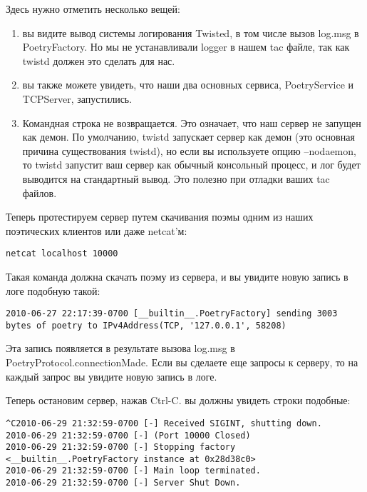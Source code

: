 Здесь нужно отметить несколько вещей:

\begin{enumerate}

\item вы видите вывод системы логирования Twisted, в том числе вызов 
log.msg в PoetryFactory. Но мы не устанавливали logger в нашем tac 
файле, так как twistd должен это сделать для нас.  

\item вы также можете увидеть, что наши два основных сервиса, PoetryService и TCPServer,
запустились.

\item Командная строка не возвращается. Это означает, что наш сервер 
не запущен как демон. По умолчанию, twistd запускает сервер как демон (это 
основная причина существования twistd), но если вы используете опцию 
--nodaemon, то twistd запустит ваш сервер как обычный консольный процесс, и 
лог будет выводится на стандартный вывод. Это полезно при отладки ваших 
tac файлов.

\end{enumerate}


Теперь протестируем сервер путем скачивания поэмы одним из 
наших поэтических клиентов или даже netcat'м:

 \begin{verbatim}
netcat localhost 10000
\end{verbatim} 

Такая команда должна скачать поэму из сервера, и вы 
увидите новую запись в логе подобную такой: 

 \begin{verbatim}
2010-06-27 22:17:39-0700 [__builtin__.PoetryFactory] sending 3003 bytes of poetry to IPv4Address(TCP, '127.0.0.1', 58208)
\end{verbatim} 


Эта запись появляется в результате вызова log.msg в 
PoetryProtocol.connectionMade. Если вы сделаете еще запросы к 
серверу, то на каждый запрос вы увидите новую запись в логе.


Теперь остановим сервер, нажав Ctrl-C. вы должны увидеть строки подобные:

 \begin{verbatim}
^C2010-06-29 21:32:59-0700 [-] Received SIGINT, shutting down.
2010-06-29 21:32:59-0700 [-] (Port 10000 Closed)
2010-06-29 21:32:59-0700 [-] Stopping factory <__builtin__.PoetryFactory instance at 0x28d38c0>
2010-06-29 21:32:59-0700 [-] Main loop terminated.
2010-06-29 21:32:59-0700 [-] Server Shut Down.
\end{verbatim} 


